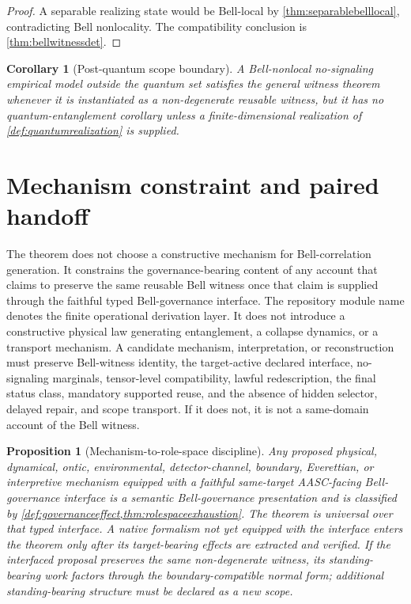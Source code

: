 \documentclass[11pt]{article}
\newtheorem{proposition}[theorem]{Proposition}
\newtheorem{corollary}[theorem]{Corollary}
\theoremstyle{definition}
\begin{document}
\begin{proof}
A separable realizing state would be Bell-local by \cref{thm:separablebelllocal}, contradicting Bell nonlocality. The compatibility conclusion is \cref{thm:bellwitnessdet}.
\end{proof}

\begin{corollary}[Post-quantum scope boundary]
A Bell-nonlocal no-signaling empirical model outside the quantum set satisfies the general witness theorem whenever it is instantiated as a non-degenerate reusable witness, but it has no quantum-entanglement corollary unless a finite-dimensional realization of \cref{def:quantumrealization} is supplied.
\end{corollary}

\section{Mechanism constraint and paired handoff}\label{sec:handoff}
The theorem does not choose a constructive mechanism for Bell-correlation generation. It constrains the governance-bearing content of any account that claims to preserve the same reusable Bell witness once that claim is supplied through the faithful typed Bell-governance interface. The repository module name  denotes the finite operational derivation layer. It does not introduce a constructive physical law generating entanglement, a collapse dynamics, or a transport mechanism. A candidate mechanism, interpretation, or reconstruction must preserve Bell-witness identity, the target-active declared interface, no-signaling marginals, tensor-level compatibility, lawful redescription, the final status class, mandatory supported reuse, and the absence of hidden selector, delayed repair, and scope transport. If it does not, it is not a same-domain account of the Bell witness.

\begin{proposition}[Mechanism-to-role-space discipline]
Any proposed physical, dynamical, ontic, environmental, detector-channel, boundary, Everettian, or interpretive mechanism equipped with a faithful same-target AASC-facing Bell-governance interface is a semantic Bell-governance presentation and is classified by \cref{def:governanceeffect,thm:rolespaceexhaustion}. The theorem is universal over that typed interface. A native formalism not yet equipped with the interface enters the theorem only after its target-bearing effects are extracted and verified. If the interfaced proposal preserves the same non-degenerate witness, its standing-bearing work factors through the boundary-compatible normal form; additional standing-bearing structure must be declared as a new scope.
\end{proposition}
\end{document}
